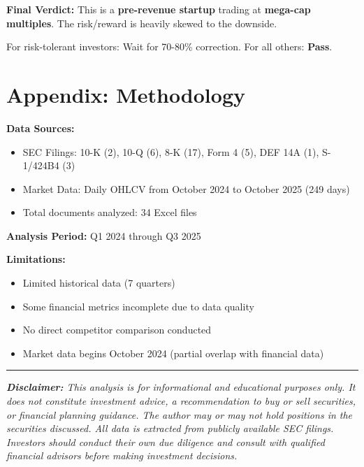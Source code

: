 \documentclass[11pt,a4paper]{article}
\begin{document}
\begin{tcolorbox}[colback=gray!10, colframe=gray!60]
\textbf{Final Verdict:} This is a \textbf{pre-revenue startup} trading at \textbf{mega-cap multiples}. The risk/reward is heavily skewed to the downside. 

For risk-tolerant investors: Wait for 70-80\% correction. For all others: \textbf{Pass}.
\end{tcolorbox}

\newpage

\section*{Appendix: Methodology}

\textbf{Data Sources:}
\begin{itemize}[itemsep=2pt]
    \item SEC Filings: 10-K (2), 10-Q (6), 8-K (17), Form 4 (5), DEF 14A (1), S-1/424B4 (3)
    \item Market Data: Daily OHLCV from October 2024 to October 2025 (249 days)
    \item Total documents analyzed: 34 Excel files
\end{itemize}

\textbf{Analysis Period:} Q1 2024 through Q3 2025

\textbf{Limitations:}
\begin{itemize}[itemsep=2pt]
    \item Limited historical data (7 quarters)
    \item Some financial metrics incomplete due to data quality
    \item No direct competitor comparison conducted
    \item Market data begins October 2024 (partial overlap with financial data)
\end{itemize}

\vspace{1cm}

\hrule

\vspace{0.5cm}

\textit{\textbf{Disclaimer:} This analysis is for informational and educational purposes only. It does not constitute investment advice, a recommendation to buy or sell securities, or financial planning guidance. The author may or may not hold positions in the securities discussed. All data is extracted from publicly available SEC filings. Investors should conduct their own due diligence and consult with qualified financial advisors before making investment decisions.}
\end{document}
